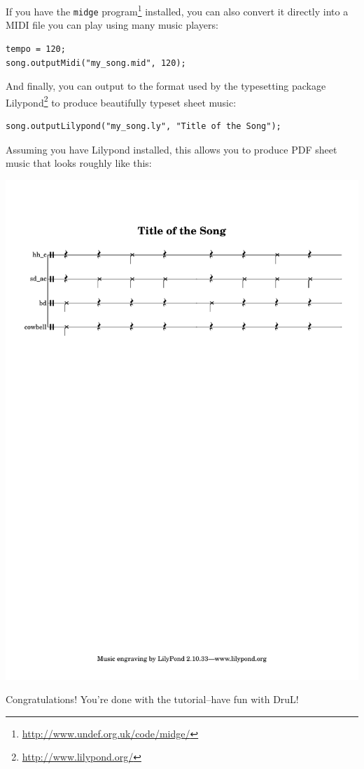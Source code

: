 If you have the {\tt midge} program\footnote{\url{http://www.undef.org.uk/code/midge/}} installed, you can also convert it directly into a MIDI file you can play using many music players:
\begin{lstlisting}
tempo = 120;
song.outputMidi("my_song.mid", 120);
\end{lstlisting}
And finally, you can output to the format used by the typesetting package Lilypond\footnote{\url{http://www.lilypond.org/}}
to produce beautifully typeset  sheet music:
\begin{lstlisting}
song.outputLilypond("my_song.ly", "Title of the Song");
\end{lstlisting}
Assuming you have Lilypond installed, this allows you to produce PDF sheet music that looks roughly like this:

\includegraphics[scale=0.8,trim=1in 7in 0.5in 0.5in]{MYSONG.pdf}

Congratulations!  You're done with the tutorial--have fun with DruL!
